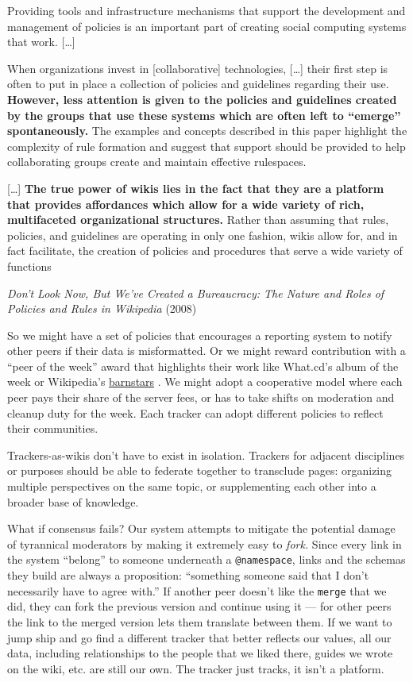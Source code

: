 \begin{leftbar}
Providing tools and infrastructure mechanisms that support the
development and management of policies is an important part of creating
social computing systems that work. {[}\ldots{]}

When organizations invest in {[}collaborative{]} technologies,
{[}\ldots{]} their first step is often to put in place a collection of
policies and guidelines regarding their use. \textbf{However, less
attention is given to the policies and guidelines created by the groups
that use these systems which are often left to ``emerge''
spontaneously.} The examples and concepts described in this paper
highlight the complexity of rule formation and suggest that support
should be provided to help collaborating groups create and maintain
effective rulespaces.

{[}\ldots{]} \textbf{The true power of wikis lies in the fact that they
are a platform that provides affordances which allow for a wide variety
of rich, multifaceted organizational structures.} Rather than assuming
that rules, policies, and guidelines are operating in only one fashion,
wikis allow for, and in fact facilitate, the creation of policies and
procedures that serve a wide variety of functions

\emph{Don't Look Now, But We've Created a Bureaucracy: The Nature and
Roles of Policies and Rules in Wikipedia} (2008) \citep{butlerDonLookNow2008} 
\end{leftbar}

So we might have a set of policies that encourages a reporting system to
notify other peers if their data is misformatted. Or we might reward
contribution with a ``peer of the week'' award that highlights their
work like What.cd's album of the week or Wikipedia's
\href{https://en.wikipedia.org/wiki/Wikipedia:Barnstars}{barnstars} \citep{wikipediaWikipediaBarnstars2022} . We might adopt a cooperative
model where each peer pays their share of the server fees, or has to
take shifts on moderation and cleanup duty for the week. Each tracker
can adopt different policies to reflect their communities.

Trackers-as-wikis don't have to exist in isolation. Trackers for
adjacent disciplines or purposes should be able to federate together to
transclude pages: organizing multiple perspectives on the same topic, or
supplementing each other into a broader base of knowledge.

What if consensus fails? Our system attempts to mitigate the potential
damage of tyrannical moderators by making it extremely easy to
\emph{fork.} Since every link in the system ``belong'' to someone
underneath a \texttt{@namespace}, links and the schemas they build are
always a proposition: ``something someone said that I don't necessarily
have to agree with.'' If another peer doesn't like the \texttt{merge}
that we did, they can fork the previous version and continue using it
--- for other peers the link to the merged version lets them translate
between them. If we want to jump ship and go find a different tracker
that better reflects our values, all our data, including relationships
to the people that we liked there, guides we wrote on the wiki, etc. are
still our own. The tracker just tracks, it isn't a platform.

